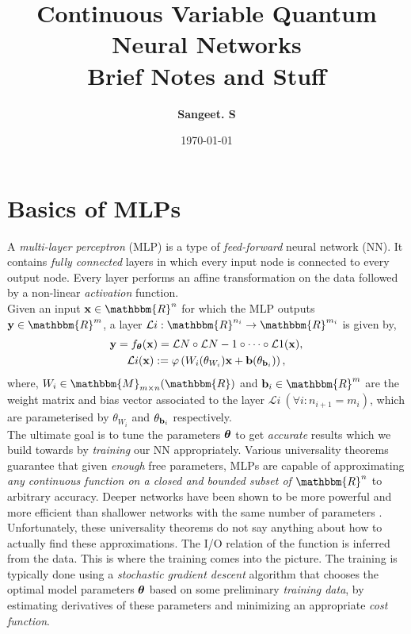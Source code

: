 \documentclass[11pt,oneside]{article}
\title{\textbf{Continuous Variable Quantum Neural Networks} \\ \vspace{2mm} \large Brief Notes and Stuff}
\author{\textbf{Sangeet. S}}
\date{\today}
\theoremstyle{definition}
\theoremstyle{definition}
\newcommand{\M}{\mathbbm{M}}
\newcommand{\R}{\mathbbm{R}}
\begin{document}
\setlength{\parindent}{0pt}
\maketitle

\section{Basics of MLPs}

A \textit{multi-layer perceptron} (MLP) is a type of \textit{feed-forward} neural network (NN). It contains \textit{fully connected} layers in which every input node is connected to every output node. Every layer performs an affine transformation on the data followed by a non-linear \textit{activation} function. \\

Given an input $\vb{x} \in \R^n$ for which the MLP outputs $\vb{y} \in \R^m$, a layer $\mathcal{L}i: \R^{n_i} \to \R^{m_i}$ is given by,
\begin{gather}
    \vb{y} = f_{\vb*{\theta}}(\vb{x}) = \mathcal{L}N \circ \mathcal{L}{N-1} \circ \dots \circ \mathcal{L}1 (\vb{x}), \\
    \mathcal{L}i(\vb{x}) := \varphi \left(W_i (\theta_{W_i})\vb{x} + \vb{b}(\theta_{\vb{b}_i}) \right), \label{2}
\end{gather}
where, $W_i \in \M_{m \times n}(\R)$ and $\vb{b}_i \in \R^m$ are the weight matrix and bias vector associated to the layer $\mathcal{L}i \ (\forall i: n_{i+1} = m_i)$, which are parameterised by $\theta_{W_i}$ and $\theta_{\vb{b}_i}$ respectively. \\

The ultimate goal is to tune the parameters $\vb*{\theta}$ to get \textit{accurate} results which we build towards by \textit{training} our NN appropriately. Various universality theorems \cite{Cybenko1989ApproximationBS,HORNIK1989359,LESHNO1993861} guarantee that given \textit{enough} free parameters, MLPs are capable of approximating \textit{any continuous function on a closed and bounded subset of} $\R^n$ to arbitrary accuracy. Deeper networks have been shown to be more powerful and more efficient than shallower networks with the same number of parameters \cite{Lin2016WhyDD, Maass1994, Montfar2013UniversalAD}. \\

Unfortunately, these universality theorems do not say anything about how to actually find these approximations. The I/O relation of the function is inferred from the data. This is where the training comes into the picture. The training is typically done using a \textit{stochastic gradient descent} algorithm that chooses the optimal model parameters $\vb*{\theta}$ based on some preliminary \textit{training data}, by estimating derivatives of these parameters and minimizing an appropriate \textit{cost function}. 
\end{document}
